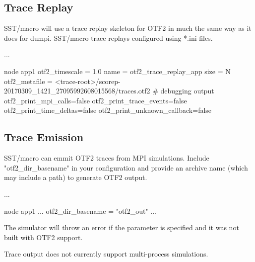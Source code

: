 \subsection{Trace Replay}
\label{subsec:otf:traceReplay}
SST/macro will use a trace replay skeleton for OTF2 in much the same way as it does for dumpi. SST/macro trace replays configured using *.ini files. 

\begin{ViFile}
...

node {
 app1 {
  otf2_timescale = 1.0
  name = otf2_trace_replay_app
  size = N
  otf2_metafile = <trace-root>/scorep-20170309_1421_27095992608015568/traces.otf2
 # debugging output
  otf2_print_mpi_calls=false
  otf2_print_trace_events=false
  otf2_print_time_deltas=false
  otf2_print_unknown_callback=false
 }
}

\end{ViFile}

\subsection{Trace Emission}
\label{subsec:otf:traceEmission}
SST/macro can emmit OTF2 traces from MPI simulations.
Include "otf2\_dir\_basename" in your configuration and provide an archive name (which may include a path) to generate OTF2 output.

\begin{ViFile}
...

node {
 app1 {
  ...
  otf2\_dir\_basename = "otf2\_out"
  ...
 }
}

\end{ViFile}

The simulator will throw an error if the parameter is specified and it was not built with OTF2 support.

Trace output does not currently support multi-process simulations.
